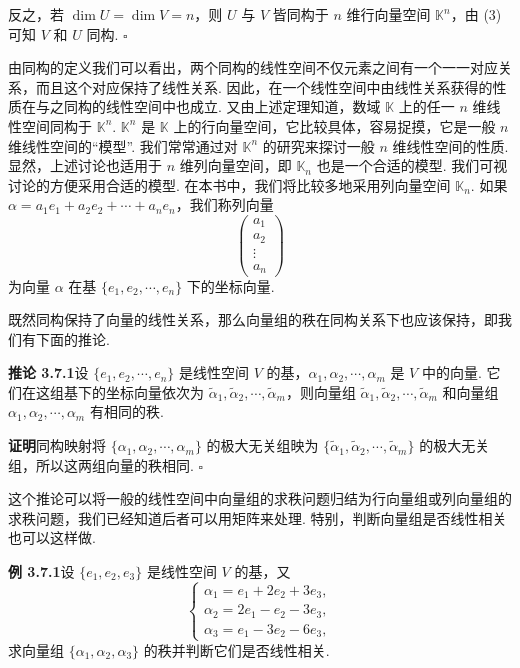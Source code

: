 \documentclass[UTF8,12pt,a4paper,fontset=fandol]{ctexart}
\begin{document}
反之，若 $\dim U=\dim V=n$，则 $U$ 与 $V$ 皆同构于 $n$ 维行向量空间 $\mathbb{K}^n$，由 (3) 可知 $V$ 和 $U$ 同构. $\square$

由同构的定义我们可以看出，两个同构的线性空间不仅元素之间有一个一一对应关系，而且这个对应保持了线性关系. 因此，在一个线性空间中由线性关系获得的性质在与之同构的线性空间中也成立. 又由上述定理知道，数域 $\mathbb{K}$ 上的任一 $n$ 维线性空间同构于 $\mathbb{K}^n$. $\mathbb{K}^n$ 是 $\mathbb{K}$ 上的行向量空间，它比较具体，容易捉摸，它是一般 $n$ 维线性空间的“模型”. 我们常常通过对 $\mathbb{K}^n$ 的研究来探讨一般 $n$ 维线性空间的性质. 显然，上述讨论也适用于 $n$ 维列向量空间，即 $\mathbb{K}_n$ 也是一个合适的模型. 我们可视讨论的方便采用合适的模型. 在本书中，我们将比较多地采用列向量空间 $\mathbb{K}_n$. 如果 $\alpha=a_1e_1+a_2e_2+\cdots+a_ne_n$，我们称列向量
\[
\left(\begin{array}{c}
a_1\\
a_2\\
\vdots\\
a_n
\end{array}\right)
\]
为向量 $\alpha$ 在基 $\{e_1,e_2,\cdots,e_n\}$ 下的坐标向量.

既然同构保持了向量的线性关系，那么向量组的秩在同构关系下也应该保持，即我们有下面的推论.

\noindent\textbf{推论 3.7.1}\quad 设 $\{e_1,e_2,\cdots,e_n\}$ 是线性空间 $V$ 的基，$\alpha_1,\alpha_2,\cdots,\alpha_m$ 是 $V$ 中的向量. 它们在这组基下的坐标向量依次为 $\widetilde{\alpha}_1,\widetilde{\alpha}_2,\cdots,\widetilde{\alpha}_m$，则向量组 $\widetilde{\alpha}_1,\widetilde{\alpha}_2,\cdots,\widetilde{\alpha}_m$ 和向量组 $\alpha_1,\alpha_2,\cdots,\alpha_m$ 有相同的秩.

\noindent\textbf{证明}\quad 同构映射将 $\{\alpha_1,\alpha_2,\cdots,\alpha_m\}$ 的极大无关组映为 $\{\widetilde{\alpha}_1,\widetilde{\alpha}_2,\cdots,\widetilde{\alpha}_m\}$ 的极大无关组，所以这两组向量的秩相同. $\square$

这个推论可以将一般的线性空间中向量组的求秩问题归结为行向量组或列向量组的求秩问题，我们已经知道后者可以用矩阵来处理. 特别，判断向量组是否线性相关也可以这样做.

\noindent\textbf{例 3.7.1}\quad 设 $\{e_1,e_2,e_3\}$ 是线性空间 $V$ 的基，又
\[
\left\{\begin{array}{l}
\alpha_1=e_1+2e_2+3e_3,\\
\alpha_2=2e_1-e_2-3e_3,\\
\alpha_3=e_1-3e_2-6e_3,
\end{array}\right.
\]
求向量组 $\{\alpha_1,\alpha_2,\alpha_3\}$ 的秩并判断它们是否线性相关.
\end{document}
